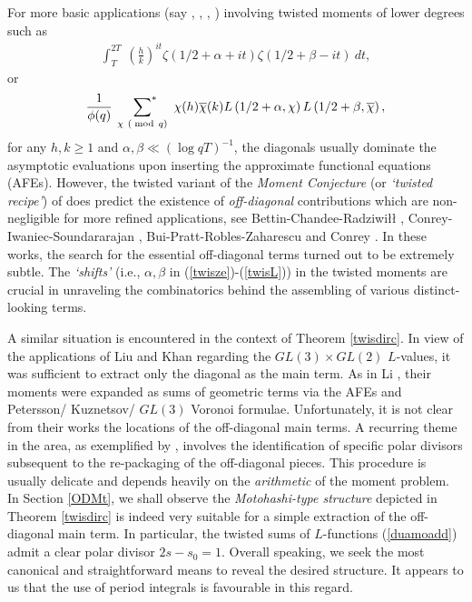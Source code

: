 \documentclass[11pt,reqno]{amsart}
\theoremstyle{definition}
\theoremstyle{definition}
\theoremstyle{remark}
\numberwithin{equation}{section}
\begin{document}
For more basic applications (say  \cite{Le74},  \cite{Y10},  \cite{BCHB85}, \cite{IS99}) involving    twisted  moments of lower degrees such as 
\begin{align}\label{twisze}
	\int_{T}^{2T} \ \left(\frac{h}{k}\right)^{it}\zeta(1/2+\alpha+it) \zeta(1/2+\beta-it)  \ dt,
\end{align}
or
\begin{align}\label{twisL}
\frac{1}{\phi(q)}	\ \ \sideset{}{^*}{\sum}_{\chi \ (\bmod\, q)} \ \chi(h) \overline{\chi}(k) L\left(1/2+ \alpha, \chi\right) L\left(1/2+ \beta, \overline{\chi}\right),
\end{align}
for any $h,k\ge 1 $ and $\alpha, \beta \ll (\log qT)^{-1}$,  the diagonals usually dominate the asymptotic evaluations  upon inserting the approximate functional equations (AFEs).      However, the twisted variant of the \textit{Moment Conjecture} (or   \textit{`twisted recipe'}) of \cite{CFKRS05}  does predict the existence of \textit{off-diagonal} contributions which are  non-negligible for more refined applications,  see   Bettin-Chandee-Radziwiłł \cite{BCR17}, Conrey-Iwaniec-Soundararajan \cite{CIS19}, Bui-Pratt-Robles-Zaharescu  \cite{BPRZ20} and Conrey \cite{C07}.  In  these works, the search for the essential off-diagonal terms turned out to be extremely subtle.  The  \textit{`shifts'} (i.e., $\alpha, \beta$ in (\ref{twisze})-(\ref{twisL})) in  the twisted moments are crucial in unraveling the combinatorics  behind the assembling of various distinct-looking terms. 
 



A similar situation is encountered in the context of Theorem \ref{twisdirc}.  In view of the applications of  Liu  \cite{Liu10} and  Khan  \cite{Kh15} regarding the    $GL(3)\times GL(2)$ $L$-values,  it was sufficient to extract only the  diagonal as the main term. As in Li \cite{Li11},   their moments were expanded as sums of  geometric terms via the AFEs and  Petersson/ Kuznetsov/ $GL(3)$ Voronoi formulae.  Unfortunately, it is  not clear from their works the locations of the off-diagonal main terms. 
A recurring theme in the area, as exemplified by  \cite{CIS12, CIS19, C07, BCR17},  involves  the identification of specific polar divisors subsequent to the re-packaging of the off-diagonal pieces.  This procedure is usually  delicate and depends heavily on the \textit{arithmetic} of the moment problem.  In Section \ref{ODMt}, we shall observe   the \textit{Motohashi-type structure}  depicted in Theorem \ref{twisdirc}  is indeed very suitable for a  simple extraction of  the off-diagonal main term.  In particular,  the twisted sums of $L$-functions  (\ref{duamoadd})   admit a clear polar divisor $2s-s_{0}=1$.  Overall speaking, we seek the most  canonical and straightforward means  to reveal the desired structure. It appears to us that the use of period integrals is  favourable in this regard. 
\end{document}
